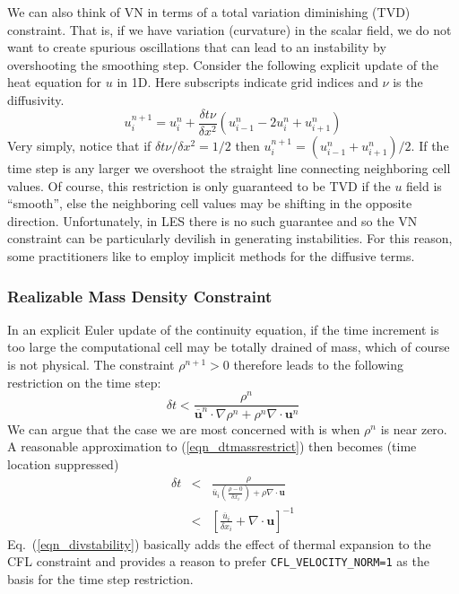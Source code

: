 \documentclass[11pt]{book}
\newcommand{\ct}{\tt\small}
\begin{document}
We can also think of VN in terms of a total variation diminishing (TVD) constraint.  That is, if we have variation (curvature) in the scalar field, we do not want to create spurious oscillations that can lead to an instability by overshooting the smoothing step.  Consider the following explicit update of the heat equation for $u$ in 1D. Here subscripts indicate grid indices and $\nu$ is the diffusivity.
\begin{equation}
u_i^{n+1} = u_i^n + \frac{\delta t \nu}{\delta x^2} (u_{i-1}^n - 2u_i^n + u_{i+1}^n )
\end{equation}
Very simply, notice that if $\delta t \nu/\delta x^2 = 1/2$ then $u_i^{n+1} = (u_{i-1}^n + u_{i+1}^n)/2$.  If the time step is any larger we overshoot the straight line connecting neighboring cell values.  Of course, this restriction is only guaranteed to be TVD if the $u$ field is ``smooth'', else the neighboring cell values may be shifting in the opposite direction.  Unfortunately, in LES there is no such guarantee and so the VN constraint can be particularly devilish in generating instabilities. For this reason, some practitioners like to employ implicit methods for the diffusive terms.

\subsubsection{Realizable Mass Density Constraint}

In an explicit Euler update of the continuity equation, if the time increment is too large the computational cell may be totally drained of mass, which of course is not physical. The constraint $\rho^{n+1}>0$ therefore leads to the following restriction on the time step:
\begin{equation}
\label{eqn_dtmassrestrict}
\delta t < \frac{\rho^n}{\overline{\mathbf{u}}^n\cdot\nabla\rho^n + \rho^n \nabla\cdot\mathbf{u}^n}
\end{equation}
We can argue that the case we are most concerned with is when $\rho^n$ is near zero.  A reasonable approximation to (\ref{eqn_dtmassrestrict}) then becomes (time location suppressed)
\begin{eqnarray}
\label{eqn_divstability}
\delta t &<& \frac{\rho}{\overline{u}_i \left(\frac{\rho-0}{\delta x_i}\right) + \rho \nabla\cdot\mathbf{u}} \nonumber\\
&<& \left[ \frac{\overline{u}_i}{\delta x_i} + \nabla\cdot\mathbf{u} \right]^{-1}
\end{eqnarray}
Eq.~(\ref{eqn_divstability}) basically adds the effect of thermal expansion to the CFL constraint and provides a reason to prefer {\ct CFL\_VELOCITY\_NORM=1} as the basis for the time step restriction.
\end{document}
